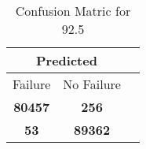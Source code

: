 \begin{table}[] 
\caption{Confusion Matric for 92.5} 
\label{Table: Prediction Accuracy-DMD92.5OnlySunEKF-ignoreReflectionEKF-top2perfectNoFailurePrediction-Reflection} 
\centering 
\begin{tabular} 
 {@{}ccc@{}} 
\toprule 
\multicolumn{2}{c}{\textbf{Predicted}}
 \\ \midrule 
\multicolumn{1}{|c|}{Failure} & 
\multicolumn{1}{c|}{No Failure}
 \\ \midrule 
\multicolumn{1}{|c|}{\color{green}\textbf{80457}} & 
\multicolumn{1}{c|}{\color{red}\textbf{256}}
 \\ \midrule 
\multicolumn{1}{|c|}{\color{red}\textbf{53}} & 
\multicolumn{1}{c|}{\color{green}\textbf{89362}}
 \\ \bottomrule 
\end{tabular} 
\end{table} 
